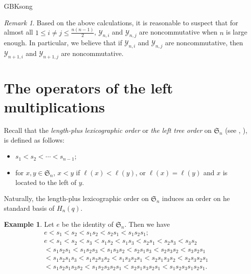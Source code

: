 \documentclass[13pt,a4paper, oneside]{amsart}       %
\numberwithin{equation}{section}
\newtheorem{lemma}[equation]{Lemma}
\theoremstyle{definition}
\newtheorem{example}[equation]{Example}
\theoremstyle{remark}
\newtheorem{remark}[equation]{Remark}
\begin{document}
\begin{CJK*}{GBK}{song}
\begin{remark}\label{Remark:Almost-all}Based on the above calculations, it is reasonable to suspect that for almost all $1 \leq i\neq j\leq \frac{n(n-1)}{2}$, $\mathscr{Y}_{n,i}$ and $\mathscr{Y}_{n,j}$ are noncommutative when $n$ is large enough.  In particular, we believe that if  $\mathscr{Y}_{n,i}$ and $\mathscr{Y}_{n,j}$ are noncommutative, then $\mathscr{Y}_{n+1,i}$ and $\mathscr{Y}_{n+1,j}$ are noncommutative.
\end{remark}



\section{The operators of the left multiplications}\label{Sec:q-symmetric}
Recall that the \textit{length-plus lexicographic order} or \textit{the left tree order} on $\mathfrak{S}_n$ (see \cite[Remark~2.1]{Doikou}, \cite{Lawson}), is defined as follows:
\begin{itemize}
  \item[(1)] $s_1<s_2<\cdots<s_{n-1}$;
  \item[(2)] for $x,y\in \mathfrak{S}_n$, $x<y$ if $\ell(x)<\ell(y)$, or $\ell(x)=\ell(y)$ and $x$ is located to the left of $y$.
\end{itemize}
Naturally, the length-plus lexicographic order on $\mathfrak{S}_n$  induces an order on  he standard basis of $H_n(q)$.

\begin{example}Let $e$ be the identity of $\mathfrak{S}_n$. Then we have
 \begin{eqnarray*}
  & e<s_1<s_2<s_1s_2<s_2s_1<s_1s_2s_1;&\\
    &e<s_1<s_2<s_3<s_1s_2<s_1s_3<s_2s_1<s_2s_3<s_3s_2&\\
  &<s_1s_2s_1<s_1s_2s_3<s_1s_3s_2 <s_2s_1s_3<s_2s_3s_2<s_{3}s_2s_1&\\
  &<s_{1}s_2s_1s_3<s_1s_2s_3s_2
  <s_1s_3s_2s_1<s_2s_1s_3s_2<s_2s_3s_2s_1&\\
  & <s_1s_2s_1s_3s_2<s_1s_2s_3s_2s_1
  <s_2s_1s_3s_2s_1<s_1s_2s_3s_1s_2s_1.&
 \end{eqnarray*}
\end{example}


\end{CJK*}
\end{document}
